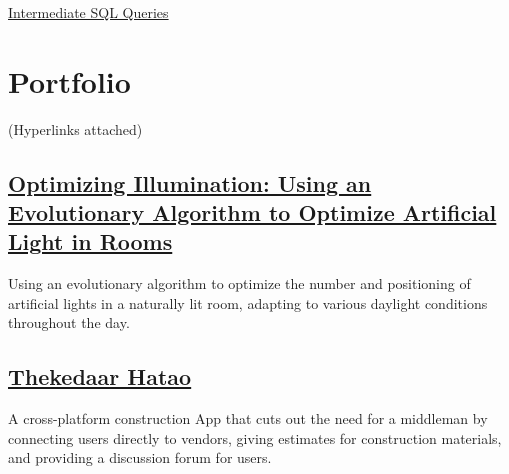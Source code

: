 \documentclass[]{resume}
\begin{document}
\begin{minipage}[t]{0.39\textwidth}

\begin{tightemize}
    \item \href{https://www.datacamp.com/statement-of-accomplishment/course/e29ed53e32ffdf34a77bf95c803fe355cb517c1a}{Intermediate SQL Queries}
\end{tightemize}


\end{minipage} 
\newpage


\section{\Large{Portfolio}}
    (Hyperlinks attached)\\

    \subsection{\href{https://github.com/aliasgharchakera/CI-Spring23-Project}{\textbf{Optimizing Illumination: Using an Evolutionary
Algorithm to Optimize Artificial Light in
Rooms}}}%
    Using an evolutionary algorithm to optimize the number and positioning of artificial lights in a naturally lit room, adapting to various daylight conditions throughout the day.

    \subsection{\href{https://github.com/aliasgharchakera/SE-Spring23-Project}{\textbf{Thekedaar Hatao}}}%
    A cross-platform construction App that cuts out the need for a middleman by connecting users directly to vendors, giving estimates for construction materials, and providing a discussion forum for users.

\end{document}
